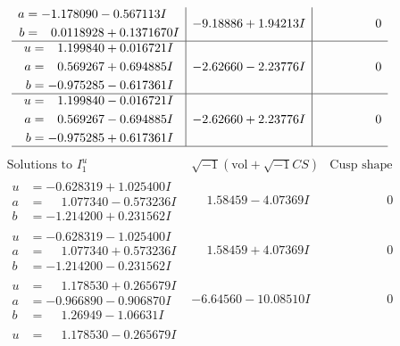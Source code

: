 \documentclass[1p]{elsarticle_modified}
\theoremstyle{definition}
\newcommand{\I}{\sqrt{-1}}
\begin{document}
$$\begin{array}{c|c|c}
\begin{aligned}
a &= -1.178090 - 0.567113 I \\
b &= \phantom{-}0.0118928 + 0.1371670 I\end{aligned}
 & -9.18886 + 1.94213 I & \phantom{-0.000000 } 0 \\ \hline\begin{aligned}
u &= \phantom{-}1.199840 + 0.016721 I \\
a &= \phantom{-}0.569267 + 0.694885 I \\
b &= -0.975285 - 0.617361 I\end{aligned}
 & -2.62660 - 2.23776 I & \phantom{-0.000000 } 0 \\ \hline\begin{aligned}
u &= \phantom{-}1.199840 - 0.016721 I \\
a &= \phantom{-}0.569267 - 0.694885 I \\
b &= -0.975285 + 0.617361 I\end{aligned}
 & -2.62660 + 2.23776 I & \phantom{-0.000000 } 0\\
 \hline 
 \end{array}$$\newpage$$\begin{array}{c|c|c}  
\text{Solutions to }I^u_{1}& \I (\text{vol} + \sqrt{-1}CS) & \text{Cusp shape}\\
 \hline 
\begin{aligned}
u &= -0.628319 + 1.025400 I \\
a &= \phantom{-}1.077340 - 0.573236 I \\
b &= -1.214200 + 0.231562 I\end{aligned}
 & \phantom{-}1.58459 - 4.07369 I & \phantom{-0.000000 } 0 \\ \hline\begin{aligned}
u &= -0.628319 - 1.025400 I \\
a &= \phantom{-}1.077340 + 0.573236 I \\
b &= -1.214200 - 0.231562 I\end{aligned}
 & \phantom{-}1.58459 + 4.07369 I & \phantom{-0.000000 } 0 \\ \hline\begin{aligned}
u &= \phantom{-}1.178530 + 0.265679 I \\
a &= -0.966890 - 0.906870 I \\
b &= \phantom{-}1.26949 - 1.06631 I\end{aligned}
 & -6.64560 - 10.08510 I & \phantom{-0.000000 } 0 \\ \hline\begin{aligned}
u &= \phantom{-}1.178530 - 0.265679 I \\

\end{aligned}
\end{array}$$
\end{document}
